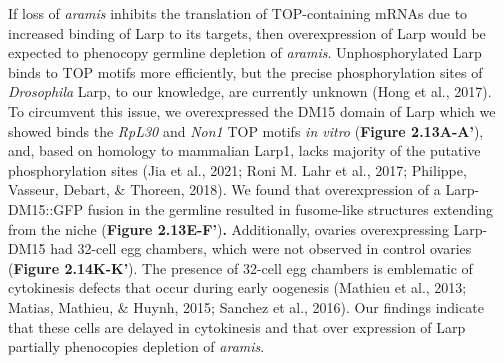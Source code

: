 \documentclass[12pt,oneside]{reedthesis}
\begin{document}
If loss of \emph{aramis} inhibits the translation of TOP-containing mRNAs due to increased binding of Larp to its targets, then overexpression of Larp would be expected to phenocopy germline depletion of \emph{aramis}. Unphosphorylated Larp binds to TOP motifs more efficiently, but the precise phosphorylation sites of \emph{Drosophila} Larp, to our knowledge, are currently unknown (Hong et al., 2017). To circumvent this issue, we overexpressed the DM15 domain of Larp which we showed binds the \emph{RpL30} and \emph{Non1} TOP motifs \emph{in vitro} (\textbf{Figure 2.13A-A'}), and, based on homology to mammalian Larp1, lacks majority of the putative phosphorylation sites (Jia et al., 2021; Roni M. Lahr et al., 2017; Philippe, Vasseur, Debart, \& Thoreen, 2018). We found that overexpression of a Larp-DM15::GFP fusion in the germline resulted in fusome-like structures extending from the niche (\textbf{Figure 2.13E-F'})\textbf{.} Additionally, ovaries overexpressing Larp-DM15 had 32-cell egg chambers, which were not observed in control ovaries (\textbf{Figure 2.14K-K'}). The presence of 32-cell egg chambers is emblematic of cytokinesis defects that occur during early oogenesis (Mathieu et al., 2013; Matias, Mathieu, \& Huynh, 2015; Sanchez et al., 2016). Our findings indicate that these cells are delayed in cytokinesis and that over expression of Larp partially phenocopies depletion of \emph{aramis}.
\end{document}
